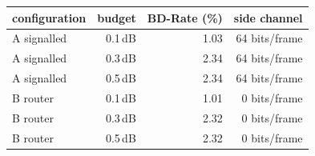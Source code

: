 \begin{tabular}{lrrr}
\toprule
configuration & budget & BD-Rate (\%) & side channel \\
\midrule
A signalled & 0.1\,dB & 1.03 & 64 bits/frame \\
A signalled & 0.3\,dB & 2.34 & 64 bits/frame \\
A signalled & 0.5\,dB & 2.34 & 64 bits/frame \\
B router & 0.1\,dB & 1.01 & 0 bits/frame \\
B router & 0.3\,dB & 2.32 & 0 bits/frame \\
B router & 0.5\,dB & 2.32 & 0 bits/frame \\
\bottomrule
\end{tabular}
